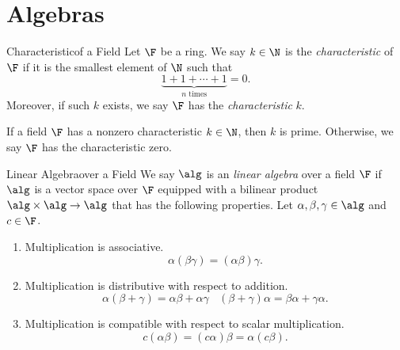 \documentclass[math_245.tex]{subfiles}
\begin{document}

    \section{Algebras} 
    
    \begin{definition}{Characteristic}{of a Field}
        Let $\F$ be a ring. We say $k\in \N$ is the \emph{characteristic} of $\F$ if it is the smallest element of $\N$ such that
        \begin{equation*}
            \underbrace{1+1+\cdots+1}_{n\text{ times}} = 0. 
        \end{equation*}
        Moreover, if such $k$ exists, we say $\F$ has the \emph{characteristic} $k$.
    \end{definition}

    \begin{remark}
        If a field $\F$ has a nonzero characteristic $k\in \N$, then $k$ is prime. Otherwise, we say $\F$ has the characteristic zero.
    \end{remark}

    \begin{definition}{Linear Algebra}{over a Field}
        We say $\alg$ is an \emph{linear algebra} over a field $\F$ if $\alg$ is a vector space over $\F$ equipped with a bilinear product $\alg\times\alg\to\alg$ that has the following properties. Let $\alpha, \beta, \gamma\in \alg$ and $c\in \F$. 

        \begin{enumerate}
            \item Multiplication is associative.
                \begin{equation*}
                    \alpha(\beta\gamma) = (\alpha\beta)\gamma.
                \end{equation*}
            \item Multiplication is distributive with respect to addition.
                \begin{equation*}
                    \alpha(\beta+\gamma) = \alpha\beta + \alpha\gamma \ \ \ \ (\beta+\gamma)\alpha = \beta\alpha + \gamma\alpha.
                \end{equation*}
            \item Multiplication is compatible with respect to scalar multiplication.
                \begin{equation*}
                    c(\alpha\beta) = (c\alpha)\beta = \alpha(c\beta).
                \end{equation*}
        \end{enumerate}
    \end{definition}
\end{document}

